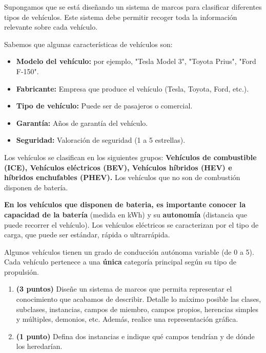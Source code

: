 \documentclass[11pt, a4paper]{article}
\newenvironment{problem}[1][Cuestión]{
	\vspace{0.5cm}
	\noindent{\Large\bfseries #1} \par\vspace{0.5cm}
}{
	\vspace{0.5cm}
}
\begin{document}
	\begin{problem}[Problema 1 (40 \%)]
		Supongamos que se está diseñando un sistema de marcos para clasificar diferentes tipos de vehículos. Este sistema debe permitir recoger toda la información relevante sobre cada vehículo.

		Sabemos que algunas características de vehículos son:

		\begin{itemize}
			\item \textbf{Modelo del vehículo:} por ejemplo, "Tesla Model 3", "Toyota Prius", "Ford F-150".
			\item \textbf{Fabricante:} Empresa que produce el vehículo (Tesla, Toyota, Ford, etc.).
			\item \textbf{Tipo de vehículo:} Puede ser de pasajeros o comercial.
			\item \textbf{Garantía:} Años de garantía del vehículo.
			\item \textbf{Seguridad:} Valoración de seguridad (1 a 5 estrellas).
		\end{itemize}

		Los vehículos se clasifican en los siguientes grupos: \textbf{Vehículos de combustible (ICE), Vehículos eléctricos (BEV), Vehículos híbridos (HEV) e híbridos enchufables (PHEV).} Los vehículos que no son de combustión disponen de batería.

		\textbf{En los vehículos que disponen de bateria, es importante conocer la capacidad de la batería} (medida en kWh) y su \textbf{autonomía} (distancia que puede recorrer el vehículo). Los vehículos eléctricos se caracterizan por el tipo de carga, que puede ser estándar, rápida o ultrarrápida.

		Algunos vehículos tienen un grado de conducción autónoma variable (de 0 a 5). Cada vehículo pertenece a una \textbf{única} categoría principal según su tipo de propulsión.

		\begin{enumerate}[label=\alph*)] 
			\item \textbf{(3 puntos)} Diseñe un sistema de marcos que permita representar el conocimiento que acabamos de describir. Detalle lo máximo posible las clases, subclases, instancias, campos de miembro, campos propios, herencias simples y múltiples, demonios, etc. Además, realice una representación gráfica.
			\item \textbf{(1 punto)} Defina dos instancias e indique qué campos tendrían y de dónde los heredarían.


\end{enumerate}
\end{problem}
\end{document}
